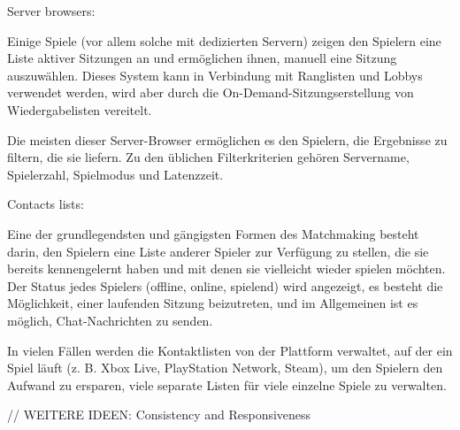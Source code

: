 Server browsers:

Einige Spiele (vor allem solche mit dedizierten Servern) zeigen den Spielern eine Liste aktiver Sitzungen an und ermöglichen ihnen, manuell eine Sitzung auszuwählen. Dieses System kann in Verbindung mit Ranglisten und Lobbys verwendet werden, wird aber durch die On-Demand-Sitzungserstellung von Wiedergabelisten vereitelt.

Die meisten dieser Server-Browser ermöglichen es den Spielern, die Ergebnisse zu filtern, die sie liefern. Zu den üblichen Filterkriterien gehören Servername, Spielerzahl, Spielmodus und Latenzzeit. 

Contacts lists:

Eine der grundlegendsten und gängigsten Formen des Matchmaking besteht darin, den Spielern eine Liste anderer Spieler zur Verfügung zu stellen, die sie bereits kennengelernt haben und mit denen sie vielleicht wieder spielen möchten. Der Status jedes Spielers (offline, online, spielend) wird angezeigt, es besteht die Möglichkeit, einer laufenden Sitzung beizutreten, und im Allgemeinen ist es möglich, Chat-Nachrichten zu senden.

In vielen Fällen werden die Kontaktlisten von der Plattform verwaltet, auf der ein Spiel läuft (z. B. Xbox Live, PlayStation Network, Steam), um den Spielern den Aufwand zu ersparen, viele separate Listen für viele einzelne Spiele zu verwalten. 




\cite{Wikipedia.2021b}

// WEITERE IDEEN: Consistency and Responsiveness